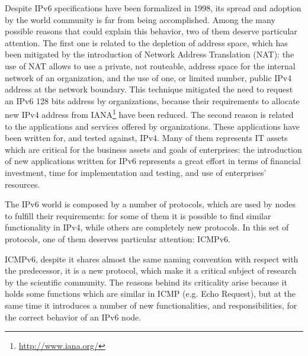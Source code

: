 \documentclass[12pt]{article}
\begin{document}
Despite IPv6 specifications have been formalized in 1998, its spread and adoption by the world community is far from being accomplished. Among the many possible reasons that could explain this behavior, two of them deserve particular attention. The first one is related to the depletion of address space, which has been mitigated by the introduction of Network Address Translation (NAT)\cite{rfc3022}: the use of NAT allows to use a private, not routeable, address space for the internal network of an organization, and the use of one, or limited number, public IPv4 address at the network boundary. This technique mitigated the need to request an IPv6 128 bits address by organizations, because their requirements to allocate new IPv4 address from IANA\footnote{\url{http://www.iana.org/}} have been reduced. The second reason is related to the applications and services offered by organizations. These applications have been written for, and tested against, IPv4. Many of them represents IT assets which are critical for the business assets and goals of enterprises: the introduction of new applications written for IPv6 represents a great effort in terms of financial investment, time for implementation and testing, and use of enterprises' resources.

The IPv6 world is composed by a number of protocols, which are used by nodes to fulfill their requirements: for some of them it is possible to find similar functionality in IPv4, while others are completely new protocols. In this set of protocols, one of them deserves particular attention: ICMPv6.

ICMPv6, despite it shares almost the same naming convention with respect with the predecessor, it is a new protocol, which make it a critical subject of research by the scientific community. The reasons behind its criticality arise because it holds some functions which are similar in ICMP (e.g. Echo Request), but at the same time it introduces a number of new functionalities, and responsibilities, for the correct behavior of an IPv6 node.
\end{document}
